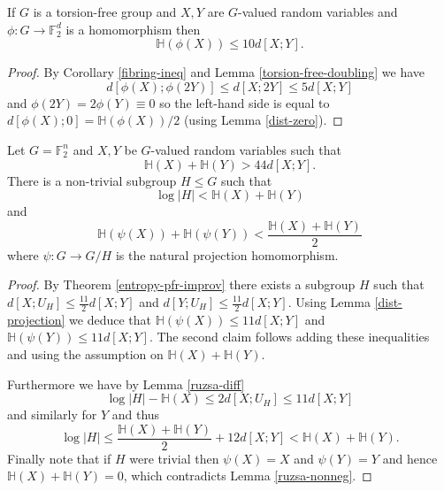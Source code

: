 \begin{lemma}\label{torsion-dist-shrinking}\leanok
If $G$ is a torsion-free group and $X,Y$ are $G$-valued random variables and $\phi:G\to \mathbb{F}_2^d$ is a homomorphism then
\[\mathbb{H}(\phi(X))\leq 10d[X;Y].\]
\end{lemma}
\begin{proof}
\leanok
By Corollary \ref{fibring-ineq} and Lemma \ref{torsion-free-doubling} we have
\[d[\phi(X);\phi(2Y)]\leq d[X;2Y]\leq 5d[X;Y]\]
and $\phi(2Y)=2\phi(Y)\equiv 0$ so the left-hand side is equal to $d[\phi(X);0]=\mathbb{H}(\phi(X))/2$ (using Lemma \ref{dist-zero}).
\end{proof}

\begin{lemma}\label{app-ent-pfr}\leanok
Let $G=\mathbb{F}_2^n$ and $X,Y$ be $G$-valued random variables such that
\[\mathbb{H}(X)+\mathbb{H}(Y)> 44d[X;Y].\]
There is a non-trivial subgroup $H\leq G$ such that
\[\log \lvert H\rvert <\mathbb{H}(X)+\mathbb{H}(Y)\] and
\[\mathbb{H}(\psi(X))+\mathbb{H}(\psi(Y))< \frac{\mathbb{H}(X)+\mathbb{H}(Y)}{2}\]
where $\psi:G\to G/H$ is the natural projection homomorphism.
\end{lemma}
\begin{proof}
By Theorem \ref{entropy-pfr-improv} there exists a subgroup $H$ such that $d[X;U_H]\leq \frac{11}{2} d[X;Y]$ and $d[Y;U_H]\leq \frac{11}{2} d[X;Y]$. Using Lemma \ref{dist-projection} we deduce that $\mathbb{H}(\psi(X))\leq 11 d[X;Y]$ and $\mathbb{H}(\psi(Y))\leq 11d[X;Y]$. The second claim follows adding these inequalities and using the assumption on $\mathbb{H}(X)+\mathbb{H}(Y)$.

Furthermore we have by Lemma \ref{ruzsa-diff}
\[\log \lvert H \rvert-\mathbb{H}(X)\leq 2d[X;U_H]\leq 11d[X;Y]\]
and similarly for $Y$ and thus
\[\log \lvert  H\rvert \leq \frac{\mathbb{H}(X)+\mathbb{H}(Y)}{2}+12d[X;Y]< \mathbb{H}(X)+\mathbb{H}(Y).\]
Finally note that if $H$ were trivial then $\psi(X)=X$ and $\psi(Y)=Y$ and hence $\mathbb{H}(X)+\mathbb{H}(Y)=0$, which contradicts Lemma \ref{ruzsa-nonneg}.
\end{proof}


